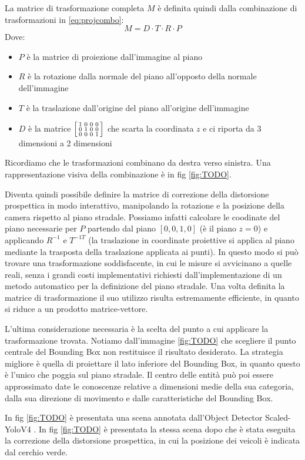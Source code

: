 La matrice di trasformazione completa $M$ è definita quindi dalla combinazione di trasformazioni in \ref{eq:projcombo}:
\begin{equation}
    \label{eq:projcombo}
    M = D \cdot T \cdot R \cdot P
\end{equation}
Dove:
\begin{itemize}
    \item $P$ è la matrice di proiezione dall'immagine al piano
    \item $R$ è la rotazione dalla normale del piano all'opposto della normale dell'immagine
    \item $T$ è la traslazione dall'origine del piano all'origine dell'immagine
    \item $D$ è la matrice 
    $
    \begin{bsmallmatrix}
        1 & 0 & 0 & 0 \\
        0 & 1 & 0 & 0 \\
        0 & 0 & 0 & 1 \\
    \end{bsmallmatrix}
    $
    che scarta la coordinata $z$ e ci riporta da 3 dimensioni a 2 dimensioni
\end{itemize}
Ricordiamo che le trasformazioni combinano da destra verso sinistra.
Una rappresentazione visiva della combinazione è in fig \ref{fig:TODO}.

Diventa quindi possibile definire la matrice di correzione della distorsione prospettica in modo interattivo, manipolando la rotazione e la posizione della camera rispetto al piano stradale.
Possiamo infatti calcolare le coodinate del piano necessarie per $P$ partendo dal piano $[0, 0, 1, 0]$ (è il piano $z=0$) e applicando $R^{-1}$ e $T^{-1T}$ (la traslazione in coordinate proiettive si applica al piano mediante la trasposta della traslazione applicata ai punti).
In questo modo si può trovare una trasformazione soddisfacente, in cui le misure si avvicinano a quelle reali, senza i grandi costi implementativi richiesti dall'implementazione di un metodo automatico per la definizione del piano stradale.
Una volta definita la matrice di trasformazione il suo utilizzo risulta estremamente efficiente, in quanto si riduce a un prodotto matrice-vettore.

L'ultima considerazione necessaria è la scelta del punto a cui applicare la trasformazione trovata.
Notiamo dall'immagine \ref{fig:TODO} che scegliere il punto centrale del Bounding Box non restituisce il risultato desiderato.
La strategia migliore è quella di proiettare il lato inferiore del Bounding Box, in quanto questo è l'unico che poggia sul piano stradale.
Il centro delle entità può poi essere approssimato date le conoscenze relative a dimensioni medie della sua categoria, dalla sua direzione di movimento e dalle caratteristiche del Bounding Box.

In fig \ref{fig:TODO} è presentata una scena annotata dall'Object Detector Scaled-YoloV4 \cite{yolocsp}.
In fig \ref{fig:TODO} è presentata la stessa scena dopo che è stata eseguita la correzione della distorsione prospettica, in cui la posizione dei veicoli è indicata dal cerchio verde.
